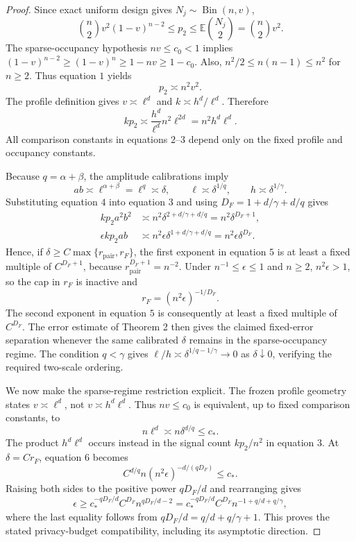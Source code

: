 \documentclass{article}
\begin{document}
\begin{proof}
Since exact uniform design gives \(N_j\sim\operatorname{Bin}(n,v)\),
\[
 \binom n2v^2(1-v)^{n-2}
 \le p_2
 \le\mathbb E\binom{N_j}{2}=\binom n2v^2. \tag{1}
\]
The sparse-occupancy hypothesis \(nv\le c_0<1\) implies
\((1-v)^{n-2}\ge(1-v)^n\ge1-nv\ge1-c_0\).  Also, \(n^2/2\le n(n-1)\le n^2\) for \(n\ge2\).  Thus equation \(1\) yields
\[
 p_2\asymp n^2v^2. \tag{2}
\]
The profile definition gives \(v\asymp\ell^d\) and \(k\asymp h^d/\ell^d\).  Therefore
\[
 kp_2\asymp
 \frac{h^d}{\ell^d}n^2\ell^{2d}
 =n^2h^d\ell^d. \tag{3}
\]
All comparison constants in equations \(2\)--\(3\) depend only on the fixed profile and occupancy constants.

Because \(q=\alpha+\beta\), the amplitude calibrations imply
\[
 ab\asymp\ell^{\alpha+\beta}=\ell^q\asymp\delta,
 \qquad
 \ell\asymp\delta^{1/q},
 \qquad
 h\asymp\delta^{1/\gamma}. \tag{4}
\]
Substituting equation \(4\) into equation \(3\) and using
\(D_F=1+d/\gamma+d/q\) gives
\[
 \begin{aligned}
 kp_2a^2b^2
 &\asymp n^2\delta^{2+d/\gamma+d/q}
 =n^2\delta^{D_F+1},\\
 \epsilon kp_2ab
 &\asymp n^2\epsilon\delta^{1+d/\gamma+d/q}
 =n^2\epsilon\delta^{D_F}. \tag{5}
 \end{aligned}
\]
Hence, if \(\delta\ge C\max\{r_{\mathrm{pair}},r_F\}\), the first exponent in equation \(5\) is at least a fixed multiple of \(C^{D_F+1}\), because \(r_{\mathrm{pair}}^{D_F+1}=n^{-2}\).  Under \(n^{-1}\le\epsilon\le1\) and \(n\ge2\), \(n^2\epsilon>1\), so the cap in \(r_F\) is inactive and
\[
 r_F=(n^2\epsilon)^{-1/D_F}.
\]
The second exponent in equation \(5\) is consequently at least a fixed multiple of \(C^{D_F}\).  The error estimate of Theorem 2 then gives the claimed fixed-error separation whenever the same calibrated \(\delta\) remains in the sparse-occupancy regime.  The condition \(q<\gamma\) gives
\(\ell/h\asymp\delta^{1/q-1/\gamma}\to0\) as \(\delta\downarrow0\), verifying the required two-scale ordering.

We now make the sparse-regime restriction explicit.  The frozen profile geometry states \(v\asymp\ell^d\), not \(v\asymp h^d\ell^d\).  Thus \(nv\le c_0\) is equivalent, up to fixed comparison constants, to
\[
 n\ell^d\asymp n\delta^{d/q}\le c_*. \tag{6}
\]
The product \(h^d\ell^d\) occurs instead in the signal count \(kp_2/n^2\) in equation \(3\).  At \(\delta=Cr_F\), equation \(6\) becomes
\[
 C^{d/q}n(n^2\epsilon)^{-d/(qD_F)}\le c_*.
\]
Raising both sides to the positive power \(qD_F/d\) and rearranging gives
\[
 \epsilon
 \ge c_*^{-qD_F/d}C^{D_F}n^{qD_F/d-2}
 =c_*^{-qD_F/d}C^{D_F}
 n^{-1+q/d+q/\gamma}, \tag{7}
\]
where the last equality follows from
\(qD_F/d=q/d+q/\gamma+1\).  This proves the stated privacy-budget compatibility, including its asymptotic direction.


\end{proof}
\end{document}
